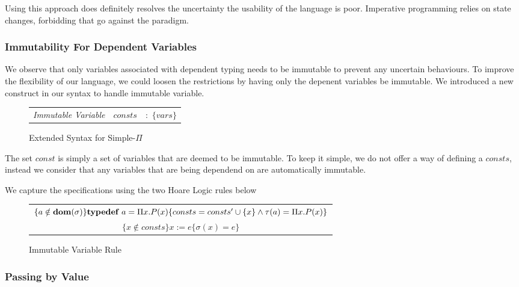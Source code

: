 \documentclass[a4paper,12pt]{report}
\begin{document}
\par
Using this approach does definitely resolves the uncertainty the usability of 
the language is poor. Imperative programming relies on state changes, forbidding 
that go against the paradigm. 

\subsubsection{Immutability For Dependent Variables}
We observe that only variables associated with dependent typing needs to be 
immutable to prevent any uncertain behaviours. To improve the flexibility of our 
language, we could loosen the restrictions by having only the depenent variables 
be immutable. We introduced a new construct in our syntax to handle immutable 
variable. 

\begin{figure}[H]
  \begin{center}
    \begin{tabular} {l l l}
      \textit{Immutable Variable} & $consts$& $:$ $\{vars\}$ \\
    \end{tabular}
  \end{center}
  \caption{Extended Syntax for Simple-$\Pi$}
\end{figure}

The set $const$ is simply a set of variables that are deemed to be immutable. To 
keep it simple, we do not offer a way of defining a $consts$, instead we 
consider that any variables that are being dependend on are automatically 
immutable. 

\par
We capture the specifications using the two Hoare Logic rules below

\begin{figure}[H]
  \begin{center}
    
    \begin{tabular}{c}
      $\{a \notin \text{\textbf{dom}}(\sigma)\}\textbf{typedef }a = \Pi x. P(x)\{consts = consts' \cup \{x\} 
      \wedge \tau(a) = \Pi x. P(x)\}$ & \\  
      $\{x \notin consts\}x := e\{\sigma(x) = e\}$
    \end{tabular}
  \end{center}
  \caption{Immutable Variable Rule}
\end{figure}

\subsubsection{Passing by Value}
\end{document}
